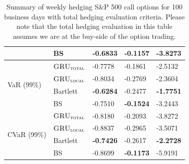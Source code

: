 \documentclass[letterpaper,12pt,titlepage,oneside,final]{book}
\numberwithin{equation}{section}
\theoremstyle{definition}
\newcommand{\modelT}{\textsc{GRU}_{\textsc{total}}}
\newcommand{\modelL}{\textsc{GRU}_{\textsc{local}}}
\begin{document}
\begin{table}[htp!]
\begin{tabular}{ll|l|l|l|}
		\multicolumn{1}{|l|}{}                                & BS            & -0.6833          & \textbf{-0.1157}          & -3.8273           \\ 
		\hline
		\multicolumn{1}{|l|}{\multirow{4}{*}{VaR (99\%)}}     & $\modelT$     & -0.7778 		 & -0.1861 					 & -2.5132           \\  
		\multicolumn{1}{|l|}{}                                & $\modelL$     & -0.8034          & -0.2769          		 & -2.3604           \\  
		\multicolumn{1}{|l|}{}                                & Bartlett      & \textbf{-0.6284} & -0.2477          		 & \textbf{-1.7751}           \\  
		\multicolumn{1}{|l|}{}                                & BS            & -0.7510          & \textbf{-0.1524}          & -3.2443 			\\ 
		\hline
		\multicolumn{1}{|l|}{\multirow{4}{*}{CVaR (99\%)}}    & $\modelT$     & -0.8180          & -0.2093                   & -3.8272           \\  
		\multicolumn{1}{|l|}{}                                & $\modelL$     & -0.8837 		 & -0.2965  		         & -3.5071          \\  
		\multicolumn{1}{|l|}{}                                & Bartlett      & \textbf{-0.7426} & -0.2617          		 & \textbf{-2.2728}           \\  
		\multicolumn{1}{|l|}{}                                & BS            & -0.8699          & \textbf{-0.1173}          & -5.9191 			\\ 
		\hline
	\end{tabular}
	\caption{Summary of weekly hedging S\&P 500 call options for 100 business days with total hedging evaluation criteria. Please note that the total hedging evaluation in this table assumes we are at the buy-side of the option trading.} \label{table:CallTotalWBuy}
\end{table}
\end{document}
